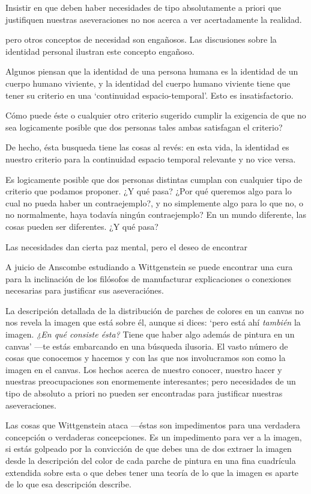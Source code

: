 Insistir en que deben haber necesidades de tipo absolutamente a priori que
justifiquen nuestras aseveraciones no nos acerca a ver acertadamente la
realidad.

pero otros conceptos de necesidad son engañosos. Las discusiones sobre la
identidad personal ilustran este concepto engañoso.

Algunos piensan que la identidad de una persona humana es la identidad de un
cuerpo humano viviente, y la identidad del cuerpo humano viviente tiene que
tener su criterio en una `continuidad espacio-temporal'. Esto es
insatisfactorio.

Cómo puede éste o cualquier otro criterio sugerido cumplir la exigencia de que
no sea logicamente posible que dos personas tales ambas satisfagan el criterio?

De hecho, ésta busqueda tiene las cosas al revés: en esta vida, la identidad es
nuestro criterio para la continuidad espacio temporal relevante y no vice versa.

Es logicamente posible que dos personas distintas cumplan con cualquier tipo de
criterio que podamos proponer. ¿Y qué pasa? ¿Por qué queremos algo para lo cual
no pueda haber un contraejemplo?, y no simplemente algo para lo que no, o no
normalmente, haya todavía ningún contraejemplo? En un mundo diferente, las cosas
pueden ser diferentes. ¿Y qué pasa?

Las necesidades dan cierta paz mental, pero el deseo de encontrar

A juicio de Anscombe estudiando a Wittgenstein se puede encontrar una cura para
la inclinación de los filósofos de manufacturar explicaciones o conexiones
necesarias para justificar sus aseveraciónes.

La descripción detallada de la distribución de parches de colores en un canvas
no nos revela la imagen que está sobre él, aunque si dices: `pero está ahí
\emph{también} la imagen. \emph{¿En qué consiste ésta?} Tiene que haber algo
además de pintura en un canvas' ---te estás embarcando en una búsqueda ilusoria.
El vasto número de cosas que conocemos y hacemos y con las que nos involucramos
son como la imagen en el canvas. Los hechos acerca de nuestro conocer, nuestro
hacer y nuestras preocupaciones son enormemente interesantes; pero necesidades
de un tipo de absoluto a priori no pueden ser encontradas para justificar
nuestras aseveraciones.

Las cosas que Wittgenstein ataca ---éstas son impedimentos para una verdadera
concepción o verdaderas concepciones. Es un impedimento para ver a la imagen, si
estás golpeado por la convicción de que debes una de dos extraer la imagen desde
la descripción del color de cada parche de pintura en una fina cuadrícula
extendida sobre esta o que debes tener una teoría de lo que la imagen es aparte
de lo que esa descripción describe.

